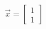 \documentclass[preview]{standalone}
\begin{document}
\begin{align*}
\vec{x} = \begin{bmatrix} 1 \\ 1 \end{bmatrix}
\end{align*}
\end{document}
